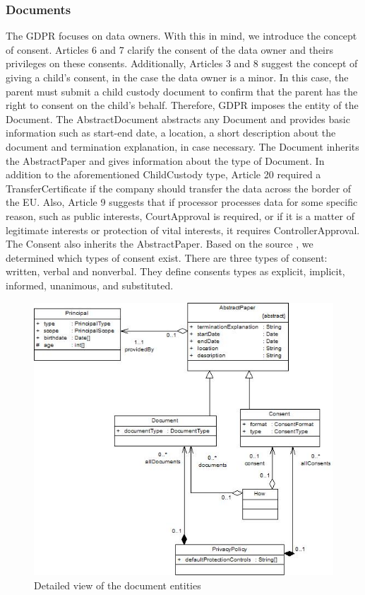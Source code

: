 \documentclass[11pt,english]{article}
\begin{document}
\subsubsection{Documents}
The GDPR focuses on data owners. With this in mind, we introduce the concept of consent. Articles 6 and 7 clarify the consent of the data owner and theirs privileges on these consents. Additionally, Articles 3 and 8 suggest the concept of giving a child's consent, in the case the data owner is a minor. In this case, the parent must submit a child custody document to confirm that the parent has the right to consent on the child's behalf. Therefore, GDPR imposes the entity of the Document. \newline The AbstractDocument abstracts any Document and provides basic information such as start-end date,  a location, a short description about the document and termination explanation, in case necessary. \newline  The Document inherits the AbstractPaper and gives information about the type of Document. In addition to the aforementioned ChildCustody type, Article 20 required a TransferCertificate if the company should transfer the data across the border of the EU. Also, Article 9 suggests that if processor processes data for some specific reason, such as public interests, CourtApproval is required, or if it is a matter of legitimate interests or protection of vital interests, it requires ControllerApproval. \newline The Consent also inherits the AbstractPaper. Based on the source \cite{consent}, we determined which types of consent exist. There are three types of consent: written, verbal and nonverbal. They define consents types as explicit, implicit, informed, unanimous, and substituted.
\begin{figure}[H]
    \centering
    \includegraphics[width=12.5cm]{images/document.jpg}
    \caption{Detailed view of the document entities}
    \label{fig:Document}
\end{figure}
\end{document}
